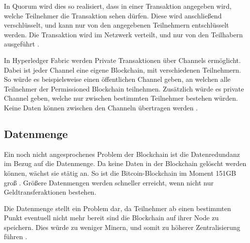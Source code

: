 In Quorum wird dies so realisiert, dass in einer Transaktion angegeben wird, welche Teilnehmer die Transaktion sehen dürfen. Diese wird anschließend verschlüsselt, und kann nur von den angegebenen Teilnehmern entschlüsselt werden. Die Transaktion wird im Netzwerk verteilt, und nur von den Teilhabern ausgeführt \cite{QuorumWikiTransaction2018}.

In Hyperledger Fabric werden Private Transaktionen über Channels ermöglicht. Dabei ist jeder Channel eine eigene Blockchain, mit verschiedenen Teilnehmern. So würde es beispielsweise einen öffentlichen Channel geben, an welchen alle Teilnehmer der Permissioned Blockchain teilnehmen. Zusätzlich würde es private Channel geben, welche nur zwischen bestimmten Teilnehmer bestehen würden. Keine Daten können zwischen den Channeln übertragen werden \cite{Channelshyperledgerfabricdocsmaster}. 



\subsection{Datenmenge}
Ein noch nicht angesprochenes Problem der Blockchain ist die Datenredundanz im Bezug auf die Datenmenge. Da keine Daten in der Blockchain gelöscht werden können, wächst sie stätig an. So ist die Bitcoin-Blockchain im Moment 151GB groß \cite{BlockchainSize}. Größere Datenmengen werden schneller erreicht, wenn nicht nur Geldtransferaktionen bestehen.

Die Datenmenge stellt ein Problem dar, da Teilnehmer ab einen bestimmten Punkt eventuell nicht mehr bereit sind die Blockchain auf ihrer Node zu speichern. Dies würde zu weniger Minern, und somit zu höherer Zentralisierung führen \cite{SchererPerformanceScalabilityBlockchain2017}.







